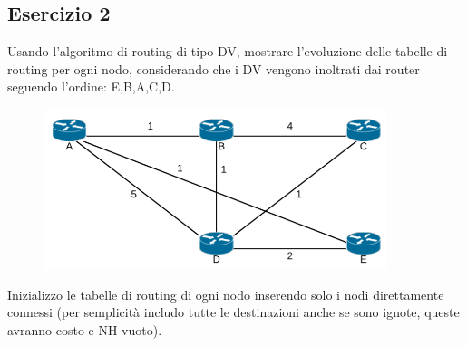 \documentclass[10pt]{article}
\begin{document}
		\subsection{Esercizio 2}
			Usando l'algoritmo di routing di tipo DV, mostrare l'evoluzione delle tabelle di routing per ogni nodo, considerando che i DV vengono inoltrati dai router seguendo l'ordine: E,B,A,C,D.
			\begin{figure}[h!]
				\centering
				\includegraphics[width=10cm]{esercizio2}
			\end{figure}
			\newline
			Inizializzo le tabelle di routing di ogni nodo inserendo solo i nodi direttamente connessi (per semplicità includo tutte le destinazioni anche se sono ignote, queste avranno costo e NH vuoto).
\end{document}
